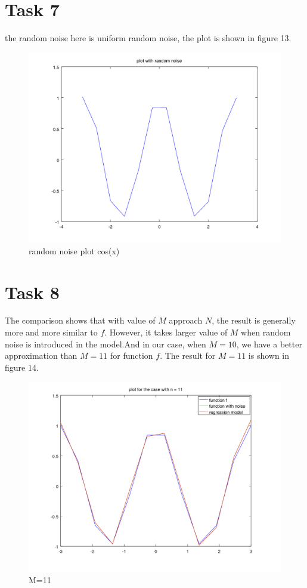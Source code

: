 \documentclass[11pt]{article}
\theoremstyle{plain}
\theoremstyle{definition}
\begin{document}
\section{Task 7}
the random noise here is uniform random noise, the plot is shown in figure 13. 
\begin{figure}
  \centering 
  \includegraphics[width=.5\linewidth]{task7_hw1.png}
  \caption{random noise plot cos(x)}
  \label{fig:random noise plot cos(x)}
\end{figure}

\section{Task 8}
The comparison shows that with value of $M$ approach $N$, the result is generally more and more similar to $f$. However, it takes larger value of $M$ when random noise is introduced in the model.And in our case, when $M=10$, we have a better approximation than $M=11$ for function $f$. The result for $M = 11$ is shown in figure 14. 

\begin{figure}
  \centering 
  \includegraphics[width=.5\linewidth]{hw1_task8_fig11.png}
  \caption{M=11}
  \label{fig:M=11}
\end{figure}
\end{document}
